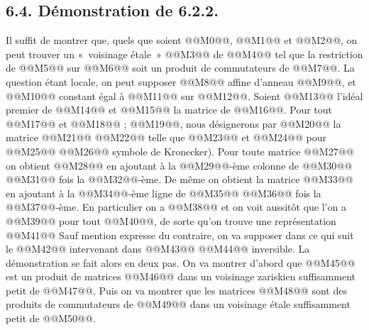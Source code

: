 
\subsection*{6.4. Démonstration de 6.2.2.}
Il suffit de montrer que, quels que soient @@M0@@, @@M1@@ et @@M2@@, on peut trouver un «~voisinage étale~» @@M3@@ de @@M4@@ tel que la restriction de @@M5@@ sur @@M6@@ soit un produit de commutateurs de @@M7@@. La question étant locale, on peut supposer @@M8@@ affine d'anneau @@M9@@, et @@M10@@ constant égal à @@M11@@ sur @@M12@@. Soient @@M13@@ l'idéal premier de @@M14@@ et @@M15@@ la matrice de @@M16@@. Pour tout @@M17@@ et @@M18@@ ; @@M19@@, nous désignerons par @@M20@@ la matrice @@M21@@ @@M22@@ telle que @@M23@@ et @@M24@@ pour @@M25@@ @@M26@@ symbole de Kronecker). Pour toute matrice @@M27@@ on obtient @@M28@@ en ajoutant à la @@M29@@-ème colonne de @@M30@@ @@M31@@ fois la @@M32@@-ème. De même on obtient la matrice @@M33@@ en ajoutant à la @@M34@@-ème ligne de @@M35@@ @@M36@@ fois la @@M37@@-ème. En particulier on a
@@M38@@
et on voit aussitôt que l'on a
@@M39@@
pour tout @@M40@@, de sorte qu'on trouve une représentation
@@M41@@
Sauf mention expresse du contraire, on va supposer dans ce qui suit le @@M42@@ intervenant dans @@M43@@ @@M44@@ inversible.
La démonstration se fait alors en deux pas. On va montrer d'abord que @@M45@@ est un produit de matrices @@M46@@ dans un voisinage zariskien suffisamment petit de @@M47@@. Puis on va montrer que les matrices @@M48@@ sont des produits de commutateurs de @@M49@@ dans un voisinage étale suffisamment petit de @@M50@@.

